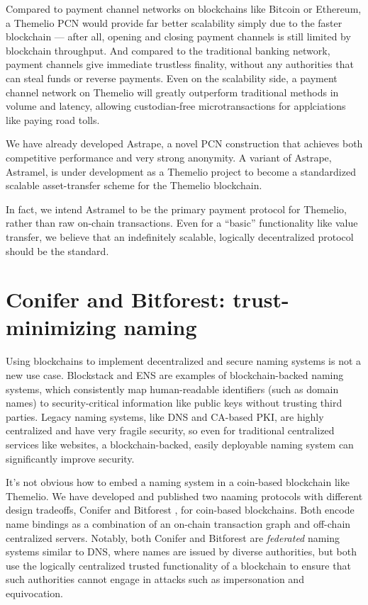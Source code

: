 \documentclass[headinclude,12pt]{scrbook}
\begin{document}
Compared to payment channel networks on blockchains like Bitcoin or Ethereum, a Themelio PCN would provide far better scalability simply due to the faster blockchain --- after all, opening and closing payment channels is still limited by blockchain throughput. And compared to the traditional banking network, payment channels give immediate trustless finality, without any authorities that can steal funds or reverse payments. Even on the scalability side, a payment channel network on Themelio will greatly outperform traditional methods in volume and latency, allowing custodian-free microtransactions for applciations like paying road tolls.

We have already developed Astrape, a novel PCN construction that achieves both competitive performance and very strong anonymity. A variant of Astrape, Astramel, is under development as a Themelio project to become a standardized scalable asset-transfer scheme for the Themelio blockchain.

In fact, we intend Astramel to be the primary payment protocol for Themelio, rather than raw on-chain transactions. Even for a ``basic'' functionality like value transfer, we believe that an indefinitely scalable, logically decentralized protocol should be the standard.

\section{Conifer and Bitforest: trust-minimizing naming}

Using blockchains to implement decentralized and secure naming systems is not a new use case. Blockstack and ENS are examples of blockchain-backed naming systems, which consistently map human-readable identifiers (such as domain names) to security-critical information like public keys without trusting third parties. Legacy naming systems, like DNS and CA-based PKI, are highly centralized and have very fragile security, so even for traditional centralized services like websites, a blockchain-backed, easily deployable naming system can significantly improve security.

It's not obvious how to embed a naming system in a coin-based blockchain like Themelio. We have developed and published two naaming protocols with different design tradeoffs, Conifer \cite{dong2018conifer} and Bitforest \cite{dong2018bitforest}, for coin-based blockchains. Both encode name bindings as a combination of an on-chain transaction graph and off-chain centralized servers. Notably, both Conifer and Bitforest are \emph{federated} naming systems similar to DNS, where names are issued by diverse authorities, but both use the logically centralized trusted functionality of a blockchain to ensure that such authorities cannot engage in attacks such as impersonation and equivocation.
\end{document}
